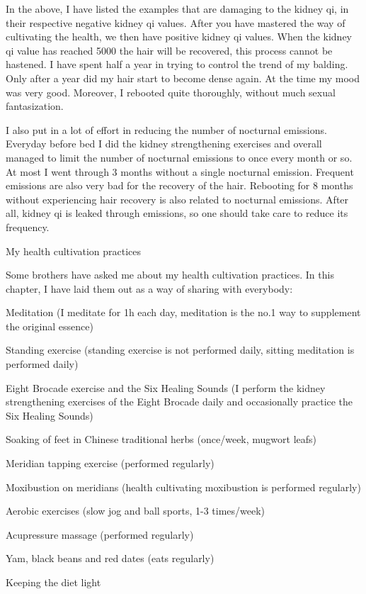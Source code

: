 \documentclass[
]{book}
\begin{document}
In the above, I have listed the examples that are damaging to the kidney qi, in their respective negative kidney qi values. After you have mastered the way of cultivating the health, we then have positive kidney qi values. When the kidney qi value has reached 5000 the hair will be recovered, this process cannot be hastened. I have spent half a year in trying to control the trend of my balding. Only after a year did my hair start to become dense again. At the time my mood was very good. Moreover, I rebooted quite thoroughly, without much sexual fantasization.

I also put in a lot of effort in reducing the number of nocturnal emissions. Everyday before bed I did the kidney strengthening exercises and overall managed to limit the number of nocturnal emissions to once every month or so. At most I went through 3 months without a single nocturnal emission. Frequent emissions are also very bad for the recovery of the hair. Rebooting for 8 months without experiencing hair recovery is also related to nocturnal emissions. After all, kidney qi is leaked through emissions, so one should take care to reduce its frequency.

My health cultivation practices

Some brothers have asked me about my health cultivation practices. In this chapter, I have laid them out as a way of sharing with everybody:

Meditation (I meditate for 1h each day, meditation is the no.1 way to supplement the original essence)

Standing exercise (standing exercise is not performed daily, sitting meditation is performed daily)

Eight Brocade exercise and the Six Healing Sounds (I perform the kidney strengthening exercises of the Eight Brocade daily and occasionally practice the Six Healing Sounds)

Soaking of feet in Chinese traditional herbs (once/week, mugwort leafs)

Meridian tapping exercise (performed regularly)

Moxibustion on meridians (health cultivating moxibustion is performed regularly)

Aerobic exercises (slow jog and ball sports, 1-3 times/week)

Acupressure massage (performed regularly)

Yam, black beans and red dates (eats regularly)

Keeping the diet light
\end{document}
